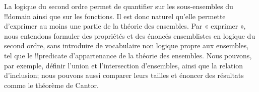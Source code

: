 \documentclass[../../../include/open-logic-section]{subfiles}
\begin{document}


La logique du second ordre permet de quantifier
sur les sous-ensembles du !!{domain} ainsi que
sur les fonctions. Il est donc naturel qu'elle
permette d'exprimer au moins une partie de la
théorie des ensembles. Par « exprimer », nous
entendons formuler des propriétés et des
énoncés ensemblistes en logique du second ordre,
sans introduire de vocabulaire non logique
propre aux ensembles, tel que le !!{predicate}
d'appartenance de la théorie des ensembles.
Nous pouvons, par exemple, définir l'union et
l'intersection d'ensembles, ainsi que la relation
d'inclusion; nous pouvons aussi comparer leurs
tailles et énoncer des résultats comme le
théorème de Cantor.
\end{document}
